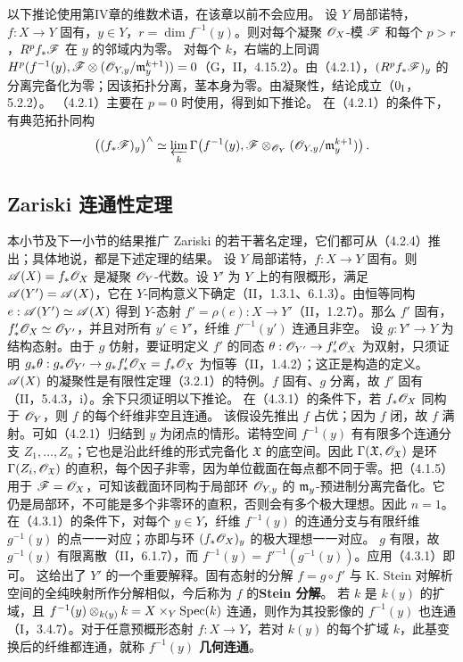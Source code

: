 以下推论使用第IV章的维数术语，在该章以前不会应用。
设 $Y$ 局部诺特，$f:X\to Y$ 固有，$y\in Y$，$r=\dim f^{-1}(y)$。则对每个凝聚 $\mathscr O_X$-模 $\mathscr F$ 和每个 $p>r$，$R^pf_*\mathscr F$ 在 $y$ 的邻域内为零。
\eproof
对每个 $k$，右端的上同调 $H^p(f^{-1}(y),\mathscr F\otimes(\mathscr O_{Y,y}/\mathfrak m_y^{k+1}))=0$（G，II，4.15.2）。由（4.2.1），$(R^pf_*\mathscr F)_y$ 的分离完备化为零；因该拓扑分离，茎本身为零。由凝聚性，结论成立（$0_{\mathrm I}$，5.2.2）。\finishproof
{}
（4.2.1）主要在 $p=0$ 时使用，得到如下推论。
在（4.2.1）的条件下，有典范拓扑同构
\[
\bigl((f_*\mathscr F)_y\bigr)^\wedge\simeq
\varprojlim_k\Gamma\!\left(f^{-1}(y),\mathscr F\otimes_{\mathscr O_Y}(\mathscr O_{Y,y}/\mathfrak m_y^{k+1})\right).
\]

\subsection{Zariski 连通性定理}
本小节及下一小节的结果推广 Zariski 的若干著名定理，它们都可从（4.2.4）推出；具体地说，都是下述定理的结果。
设 $Y$ 局部诺特，$f:X\to Y$ 固有。则 $\mathscr A(X)=f_*\mathscr O_X$ 是凝聚 $\mathscr O_Y$-代数。设 $Y'$ 为 $Y$ 上的有限概形，满足 $\mathscr A(Y')=\mathscr A(X)$，它在 $Y$-同构意义下确定（II，1.3.1、6.1.3）。由恒等同构 $e:\mathscr A(Y')\simeq\mathscr A(X)$ 得到 $Y$-态射 $f'=\rho(e):X\to Y'$（II，1.2.7）。那么 $f'$ 固有，$f'_*\mathscr O_X\simeq\mathscr O_{Y'}$，并且对所有 $y'\in Y'$，纤维 $f'^{-1}(y')$ 连通且非空。
\eproof
设 $g:Y'\to Y$ 为结构态射。由于 $g$ 仿射，要证明定义 $f'$ 的同态 $\theta:\mathscr O_{Y'}\to f'_*\mathscr O_X$ 为双射，只须证明 $g_*\theta:g_*\mathscr O_{Y'}\to g_*f'_*\mathscr O_X=f_*\mathscr O_X$ 为恒等（II，1.4.2）；这正是构造的定义。$\mathscr A(X)$ 的凝聚性是有限性定理（3.2.1）的特例。$f$ 固有、$g$ 分离，故 $f'$ 固有（II，5.4.3，i）。余下只须证明以下推论。\finishproof
{}
在（4.3.1）的条件下，若 $f_*\mathscr O_X$ 同构于 $\mathscr O_Y$，则 $f$ 的每个纤维非空且连通。
\eproof
该假设先推出 $f$ 占优；因为 $f$ 闭，故 $f$ 满射。可如（4.2.1）归结到 $y$ 为闭点的情形。诺特空间 $f^{-1}(y)$ 有有限多个连通分支 $Z_1,\ldots,Z_n$；它也是沿此纤维的形式完备化 $\mathfrak X$ 的底空间。因此 $\Gamma(\mathfrak X,\mathscr O_{\mathfrak X})$ 是环 $\Gamma(Z_i,\mathscr O_{\mathfrak X})$ 的直积，每个因子非零，因为单位截面在每点都不同于零。把（4.1.5）用于 $\mathscr F=\mathscr O_X$，可知该截面环同构于局部环 $\mathscr O_{Y,y}$ 的 $\mathfrak m_y$-预进制分离完备化。它仍是局部环，不可能是多个非零环的直积，否则会有多个极大理想。因此 $n=1$。\finishproof
{}
在（4.3.1）的条件下，对每个 $y\in Y$，纤维 $f^{-1}(y)$ 的连通分支与有限纤维 $g^{-1}(y)$ 的点一一对应；亦即与环 $(f_*\mathscr O_X)_y$ 的极大理想一一对应。
\eproof
$g$ 有限，故 $g^{-1}(y)$ 有限离散（II，6.1.7），而 $f^{-1}(y)=f'^{-1}(g^{-1}(y))$。应用（4.3.1）即可。\finishproof
这给出了 $Y'$ 的一个重要解释。固有态射的分解 $f=g\circ f'$ 与 K. Stein 对解析空间的全纯映射所作分解相似，今后称为 $f$ 的\textbf{Stein 分解}。
若 $k$ 是 $k(y)$ 的扩域，且 $f^{-1}(y)\otimes_{k(y)}k=X\times_Y\operatorname{Spec}(k)$ 连通，则作为其投影像的 $f^{-1}(y)$ 也连通（I，3.4.7）。对于任意预概形态射 $f:X\to Y$，若对 $k(y)$ 的每个扩域 $k$，此基变换后的纤维都连通，就称 $f^{-1}(y)$ \textbf{几何连通}。


